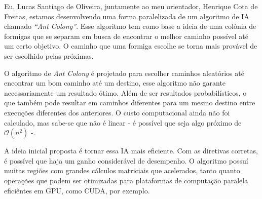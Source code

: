 Eu, Lucas Santiago de Oliveira, juntamente ao meu orientador, Henrique Cota de Freitas, estamos
desenvolvendo uma forma paralelizada de um algoritmo de IA chamado \emph{``Ant Colony''}. Esse algoritmo tem como
base a ideia de uma colônia de formigas que se separam em busca de encontrar o melhor caminho
possível até um certo objetivo. O caminho que uma formiga escolhe se torna mais provável de ser escolhido
pelas próximas.

O algoritmo de \emph{Ant Colony} é projetado para escolher caminhos aleatórios até encontrar um bom caminho até um destino,
esse algoritmo não garante necessariamente um resultado ótimo. Além de ser resultados probabilísticos, o que também pode resultar
em caminhos diferentes para um mesmo destino entre execuções diferentes dos anteriores. O custo computacional ainda não foi
calculado, mas sabe-se que não é linear - é possível que seja algo próximo de $\mathcal{O}(n^2)$ -.

A ideia inicial proposta é tornar essa IA mais eficiente. Com as diretivas corretas, é possível que haja um ganho considerável de 
desempenho. O algoritmo possuí muitas regiões com grandes cálculos matriciais que acelerados, tanto quanto operações que
podem ser otimizadas para plataformas de computação paralela eficiêntes em GPU, como CUDA, por exemplo.
